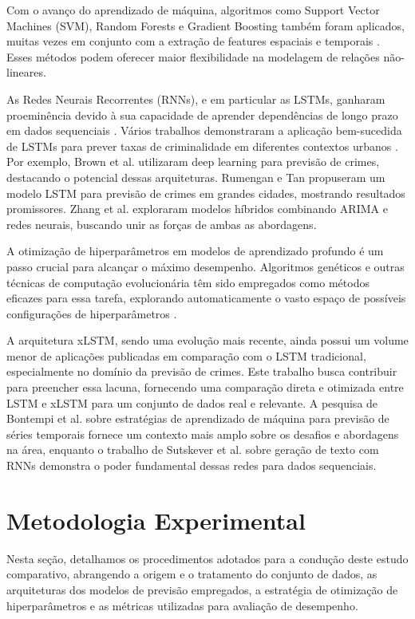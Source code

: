 \documentclass[conference]{IEEEtran}
\begin{document}
Com o avanço do aprendizado de máquina, algoritmos como Support Vector Machines (SVM), Random Forests e Gradient Boosting também foram aplicados, muitas vezes em conjunto com a extração de features espaciais e temporais \cite{referencia_apropriada_ml_crime}. Esses métodos podem oferecer maior flexibilidade na modelagem de relações não-lineares.

As Redes Neurais Recorrentes (RNNs), e em particular as LSTMs, ganharam proeminência devido à sua capacidade de aprender dependências de longo prazo em dados sequenciais \cite{b1}. Vários trabalhos demonstraram a aplicação bem-sucedida de LSTMs para prever taxas de criminalidade em diferentes contextos urbanos \cite{b4, b5}. Por exemplo, Brown et al. \cite{b4} utilizaram deep learning para previsão de crimes, destacando o potencial dessas arquiteturas. Rumengan e Tan \cite{b5} propuseram um modelo LSTM para previsão de crimes em grandes cidades, mostrando resultados promissores. Zhang et al. \cite{b6} exploraram modelos híbridos combinando ARIMA e redes neurais, buscando unir as forças de ambas as abordagens.

A otimização de hiperparâmetros em modelos de aprendizado profundo é um passo crucial para alcançar o máximo desempenho. Algoritmos genéticos e outras técnicas de computação evolucionária têm sido empregados como métodos eficazes para essa tarefa, explorando automaticamente o vasto espaço de possíveis configurações de hiperparâmetros \cite{b4, referencia_apropriada_ga_dl}.

A arquitetura xLSTM, sendo uma evolução mais recente, ainda possui um volume menor de aplicações publicadas em comparação com o LSTM tradicional, especialmente no domínio da previsão de crimes. Este trabalho busca contribuir para preencher essa lacuna, fornecendo uma comparação direta e otimizada entre LSTM e xLSTM para um conjunto de dados real e relevante. A pesquisa de Bontempi et al. \cite{b2} sobre estratégias de aprendizado de máquina para previsão de séries temporais fornece um contexto mais amplo sobre os desafios e abordagens na área, enquanto o trabalho de Sutskever et al. \cite{b3} sobre geração de texto com RNNs demonstra o poder fundamental dessas redes para dados sequenciais.

\section{Metodologia Experimental}
\label{sec:metodologia}
Nesta seção, detalhamos os procedimentos adotados para a condução deste estudo comparativo, abrangendo a origem e o tratamento do conjunto de dados, as arquiteturas dos modelos de previsão empregados, a estratégia de otimização de hiperparâmetros e as métricas utilizadas para avaliação de desempenho.
\end{document}
